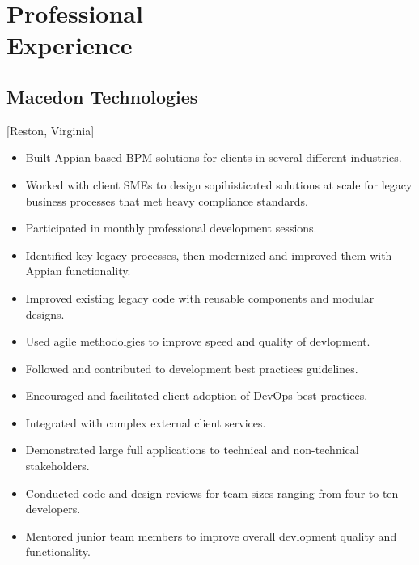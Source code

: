 \documentclass{mycv}
\begin{document}
\maketitle%

\section{Professional \\ Experience}

\subsection{Macedon Technologies}[Reston, Virginia]
\begin{positions}
\end{positions}

\begin{itemize}
  \item Built Appian based BPM solutions for clients in several different industries.
  \item Worked with client SMEs to design sopihisticated solutions at scale for legacy business processes that met heavy compliance standards.
  \item Participated in monthly professional development sessions.
  \item Identified key legacy processes, then modernized and improved them with Appian functionality.
  \item Improved existing legacy code with reusable components and modular designs.
  \item Used agile methodolgies to improve speed and quality of devlopment.
  \item Followed and contributed to development best practices guidelines.
  \item Encouraged and facilitated client adoption of DevOps best practices.
  \item Integrated with complex external client services.
  \item Demonstrated large full applications to technical and non-technical stakeholders.
  \item Conducted code and design reviews for team sizes ranging from four to ten developers.
  \item Mentored junior team members to improve overall devlopment quality and functionality.
\end{itemize}
\end{document}
